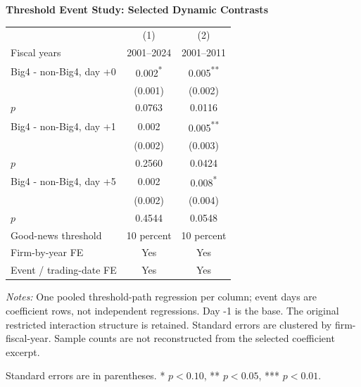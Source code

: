 \documentclass[10pt]{article}
\newcommand{\sym}[1]{\textsuperscript{#1}}
\begin{document}
\begin{minipage}{18.00cm}
\fontsize{10}{12}\selectfont
\setlength{\tabcolsep}{4pt}\renewcommand{\arraystretch}{1.08}
{\large\bfseries Threshold Event Study: Selected Dynamic Contrasts}\par\medskip
\begin{tabular*}{\linewidth}{@{\extracolsep{\fill}}lcc@{}}
\toprule
 & (1) & (2) \\
Fiscal years & 2001--2024 & 2001--2011 \\
\midrule
Big4 - non-Big4, day +0 & 0.002\sym{*} & 0.005\sym{**} \\
 & (0.001) & (0.002) \\
$p$ & 0.0763 & 0.0116 \\
Big4 - non-Big4, day +1 & 0.002 & 0.005\sym{**} \\
 & (0.002) & (0.003) \\
$p$ & 0.2560 & 0.0424 \\
Big4 - non-Big4, day +5 & 0.002 & 0.008\sym{*} \\
 & (0.002) & (0.004) \\
$p$ & 0.4544 & 0.0548 \\
\midrule
Good-news threshold & 10 percent & 10 percent \\
Firm-by-year FE & Yes & Yes \\
Event / trading-date FE & Yes & Yes \\
\bottomrule\end{tabular*}\par\medskip
\fontsize{9}{11}\selectfont\textit{Notes:} One pooled threshold-path regression per column; event days are coefficient rows, not independent regressions. Day -1 is the base. The original restricted interaction structure is retained. Standard errors are clustered by firm-fiscal-year. Sample counts are not reconstructed from the selected coefficient excerpt.
\par Standard errors are in parentheses. * $p<0.10$, ** $p<0.05$, *** $p<0.01$.
\end{minipage}
\end{document}
